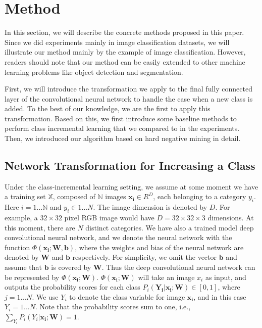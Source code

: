 \chapter{Method}
In this section, we will describe the concrete methods proposed in this paper. Since we did experiments mainly in image classification datasets, we will illustrate our method mainly by the example of image classification. However, readers should note that our method can be easily extended to other machine learning problems like object detection and segmentation.

First, we will introduce the transformation we apply to the final fully connected layer of the convolutional neural network to handle the case when a new class is added. To the best of our knowledge, we are the first to apply this transformation. Based on this, we first introduce some baseline methods to perform class incremental learning that we compared to in the experiments. Then, we introduced our algorithm based on hard negative mining in detail.

\section{Network Transformation for Increasing a Class}

Under the class-incremental learning setting, we assume at some moment we have a training set $\mathbb{X}$, composed of $\mathbb{N}$ images $\mathbf{x_i} \in R^D$, each belonging to a category $y_i$. Here $i = 1 ...\mathbb{N}$ and $y_i \in 1 ... N$. The image dimension is denoted by $D$. For example, a $32\times32$ pixel RGB image would have $D=32\times32\times3$ dimensions. At this moment, there are $N$ distinct categories. We have also a trained model deep convolutional neural network, and we denote the neural network with the function $\Phi(\mathbf{x_i}; \mathbf{W}, \mathbf{b})$, where the weights and bias of the neural network are denoted by $\mathbf{W}$ and $\mathbf{b}$ respectively. For simplicity, we omit the vector $\mathbf{b}$ and assume that $\mathbf{b}$ is covered by $\mathbf{W}$. Thus the deep convolutional neural network can be represented by $\Phi(\mathbf{x_i}; \mathbf{W})$. $\Phi(\mathbf{x_i}; \mathbf{W})$ will take an image $x_i$ as input, and outputs the probability scores for each class $P_i(\mathbf{Y_i}|\mathbf{x_i};\mathbf{W})\in [0,1]$, where $j = 1 ... N$. We use $Y_i$ to denote the class variable for image $\mathbf{x_i}$, and in this case $Y_i =1...N$.  Note that the probability scores sum to one, i.e., $\sum_{Y_i} P_i(Y_i|\mathbf{x_i};\mathbf{W}) = 1$.

